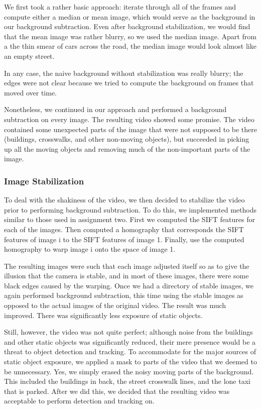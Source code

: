 \documentclass[a4paper, 10pt, conference]{ieeeconf}      %
\begin{document}
We first took a rather basic approach: iterate through all of the frames and compute either a median or mean image, which would serve as the background in our background subtraction. Even after background stabilization, we would find that the mean image was rather blurry, so we used the median image. Apart from a the thin smear of cars across the road, the median image would look almost like an empty street. \newline

In any case, the naive background without stabilization was really blurry; the edges were not clear because we tried to compute the background on frames that moved over time. \newline

Nonetheless, we continued in our approach and performed a background subtraction on every image. The resulting video showed some promise. The video contained some unexpected parts of the image that were not supposed to be there (buildings, crosswalks, and other non-moving objects), but succeeded in picking up all the moving objects and removing much of the non-important parts of the image. \newline


\subsubsection{Image Stabilization}

To deal with the shakiness of the video, we then decided to stabilize the video prior to performing background subtraction. To do this, we implemented methods similar to those used in assignment two. First we computed the SIFT features for each of the images. Then computed a homography that corresponds the SIFT features of image i to the SIFT features of image 1. Finally, use the computed homography to warp image i onto the space of image 1. \newline

The resulting images were such that each image adjusted itself so as to give the illusion that the camera is stable, and in most of these images, there were some black edges caused by the warping. Once we had a directory of stable images, we again performed background subtraction, this time using the stable images as opposed to the actual images of the original video. The result was much improved. There was significantly less exposure of static objects. \newline

Still, however, the video was not quite perfect; although noise from the buildings and other static objects was significantly reduced, their mere presence would be a threat to object detection and tracking. To accommodate for the major sources of static object exposure, we applied a mask to parts of the video that we deemed to be unnecessary. Yes, we simply erased the noisy moving parts of the background. This included the buildings in back, the street crosswalk lines, and the lone taxi that is parked. After we did this, we decided that the resulting video was acceptable to perform detection and tracking on.\newline
\end{document}
